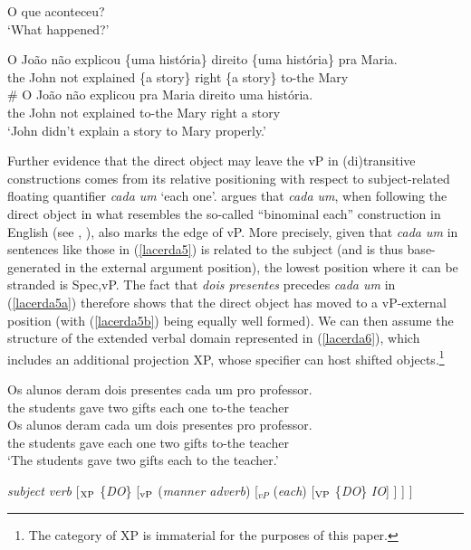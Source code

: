 \documentclass[output=paper]{langscibook}
\begin{document}
\begin{exe}
\ex \label{lacerda4}
 \begin{xlist}
 \label{lacerda4A}
O que aconteceu?\\
`What happened?'

 \label{lacerda4B1}
\gll O João não explicou \{uma história\} direito \{uma	história\} pra Maria.\\
the John not explained \{a story\} right \{a story\} to-the Mary\\

 \label{lacerda4B2}
\gll \# O João não explicou pra Maria direito uma história.\\
{} the	John not explained to-the Mary right a story\\
\glt ‘John didn’t explain a story to Mary properly.’

    \end{xlist}
\end{exe}

Further evidence that the direct object may leave the vP in (di)transitive constructions comes from its relative positioning with respect to subject-related floating quantifier \emph{cada um} ‘each one’. \citet{Lacerda2012,Lacerda2016a} argues that \emph{cada um}, when following the direct object in what resembles the so-called “binominal each” construction in English (see \citealt{SafirStowell1988}, \citealt{Stowell2013}), also marks the edge of vP. More precisely, given that \emph{cada um} in sentences like those in (\ref{lacerda5}) is related to the subject (and is thus base-generated in the external argument position), the lowest position where it can be stranded is Spec,vP. The fact that \emph{dois presentes} precedes \emph{cada um} in (\ref{lacerda5a}) therefore shows that the direct object has moved to a vP-external position (with (\ref{lacerda5b}) being equally well formed). We can then assume the structure of the extended verbal domain represented in (\ref{lacerda6}), which includes an additional projection XP, whose specifier can host shifted objects.\footnote{The category of XP is immaterial for the purposes of this paper.} 

\begin{exe}
\ex \label{lacerda5}
\begin{xlist}
\ex \label{lacerda5a}
\gll Os alunos deram dois presentes cada um pro professor.\\
the students gave two gifts	each	one	to-the teacher\\

\ex \label{lacerda5b}
\gll Os alunos deram cada um dois presentes pro professor.\\
the students	gave each one	two	gifts to-the teacher\\
\glt‘The students gave two gifts each to the teacher.’
\end{xlist}

\ex \label{lacerda6} \emph{subject verb} [$_{\textnormal{XP}}$ \{\emph{DO}\} [$_{\textnormal{vP}}$ (\emph{manner adverb}) [$_{vP}$ (\emph{each}) [$_{\textnormal{VP}}$ \{\emph{DO}\} \emph{IO}] ] ] ]
\end{exe}
\end{document}
